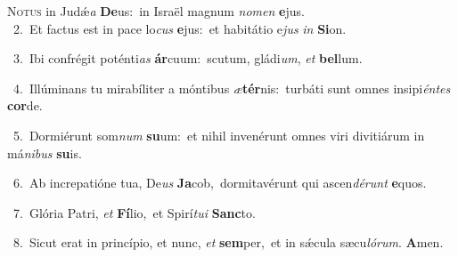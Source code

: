 \lettrine{\initial\textcolor{\initialcolor}{N}}{otus} in Judǽ\textit{a} \textbf{De}\-us:~\star in Israël magnum \textit{no}\-\textit{men} \textbf{e}\-jus.\\
{\numbfont\textcolor{\numbcolor}{~2.}}~Et factus est in pace lo\textit{cus} \textbf{e}\-jus:~\star et habitátio e\textit{jus} \textit{in} \textbf{Si}\-on.\par
{\numbfont\textcolor{\numbcolor}{~3.}}~Ibi confrégit poténti\textit{as} \textbf{ár}\-cuum:~\star scutum, gládi\-\textit{um}\-, \textit{et} \textbf{bel}\-lum.\par
{\numbfont\textcolor{\numbcolor}{~4.}}~Illúminans tu mirabíliter a móntibus \textit{æ}\-\textbf{tér}nis:~\star turbáti sunt omnes insipi\-\textit{én}\-\textit{tes} \textbf{cor}\-de.\par
{\numbfont\textcolor{\numbcolor}{~5.}}~Dormiérunt som\textit{num} \textbf{su}\-um:~\star et nihil invenérunt omnes viri divitiárum in má\-\textit{ni}\-\textit{bus} \textbf{su}\-is.\par
{\numbfont\textcolor{\numbcolor}{~6.}}~Ab increpatióne tua, De\textit{us} \textbf{Ja}\-cob,~\star dormitavérunt qui ascen\-\textit{dé}\-\textit{runt} \textbf{e}\-quos.\par
{\numbfont\textcolor{\numbcolor}{~7.}}~Glória Patri, \textit{et} \textbf{Fí}\-lio,~\star et Spirí\-\textit{tu}\-\textit{i} \textbf{Sanc}\-to.\par
{\numbfont\textcolor{\numbcolor}{~8.}}~Sicut erat in princípio, et nunc, \textit{et} \textbf{sem}\-per,~\star et in sǽcula sæcu\-\textit{ló}\-\textit{rum}. \textbf{A}\-men.\par
